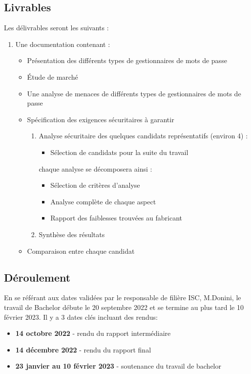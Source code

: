 \subsection*{Livrables}
Les délivrables seront les suivants :
\begin{enumerate}
\item Une documentation contenant :
	\begin{itemize}
	\item Présentation des différents types de gestionnaires de mots de passe
	\item Étude de marché
	\item Une analyse de menaces de différents types de gestionnaires de mots de passe
	\item Spécification des exigences sécuritaires à garantir
	\begin{enumerate}
	\item Analyse sécuritaire des quelques candidats représentatifs (environ 4) :
		\begin{itemize}
		\item Sélection de candidats pour la suite du travail
		\end{itemize}
	chaque analyse se décomposera ainsi :
		\begin{itemize}
			\item Sélection de critères d'analyse
			\item Analyse complète de chaque aspect
			\item Rapport des faiblesses trouvées au fabricant
		\end{itemize}
	\item Synthèse des résultats
	\end{enumerate}
    \item Comparaison entre chaque candidat
	\end{itemize}
\end{enumerate}

\subsection*{Déroulement}
En se référant aux dates validées par le responsable de filière ISC, M.Donini, le travail de Bachelor débute le 20 septembre 2022 et se termine au plus tard le 10 février 2023. Il y a 3 dates clés incluant des rendus:
\begin{itemize}
	\item \textbf{14 octobre 2022} - rendu du rapport intermédiaire
	\item \textbf{14 décembre 2022} - rendu du rapport final
	\item \textbf{23 janvier au 10 février 2023} - soutenance du travail de bachelor
\end{itemize}


